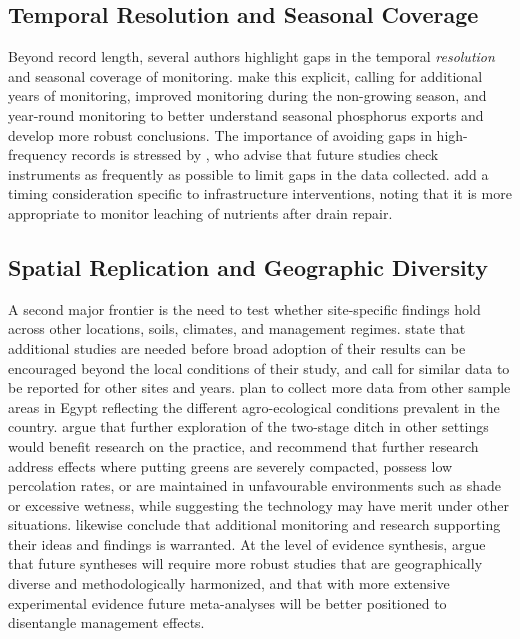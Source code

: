 \documentclass[11pt]{article}
\begin{document}
\subsection{Temporal Resolution and Seasonal Coverage}

Beyond record length, several authors highlight gaps in the temporal \emph{resolution} and seasonal coverage of monitoring. \textcite{Klaiber2020} make this explicit, calling for additional years of monitoring, improved monitoring during the non-growing season, and year-round monitoring to better understand seasonal phosphorus exports and develop more robust conclusions. The importance of avoiding gaps in high-frequency records is stressed by \textcite{Hodaj2017}, who advise that future studies check instruments as frequently as possible to limit gaps in the data collected. \textcite{Wesström2015} add a timing consideration specific to infrastructure interventions, noting that it is more appropriate to monitor leaching of nutrients after drain repair.

\subsection{Spatial Replication and Geographic Diversity}

A second major frontier is the need to test whether site-specific findings hold across other locations, soils, climates, and management regimes. \textcite{Menegaz2025} state that additional studies are needed before broad adoption of their results can be encouraged beyond the local conditions of their study, and \textcite{Zimmerman2017b} call for similar data to be reported for other sites and years. \textcite{Ali2001} plan to collect more data from other sample areas in Egypt reflecting the different agro-ecological conditions prevalent in the country. \textcite{Hodaj2017} argue that further exploration of the two-stage ditch in other settings would benefit research on the practice, and \textcite{Bigelow2001} recommend that further research address effects where putting greens are severely compacted, possess low percolation rates, or are maintained in unfavourable environments such as shade or excessive wetness, while suggesting the technology may have merit under other situations. \textcite{Terrado2015} likewise conclude that additional monitoring and research supporting their ideas and findings is warranted. At the level of evidence synthesis, \textcite{Wu2025} argue that future syntheses will require more robust studies that are geographically diverse and methodologically harmonized, and that with more extensive experimental evidence future meta-analyses will be better positioned to disentangle management effects.
\end{document}
